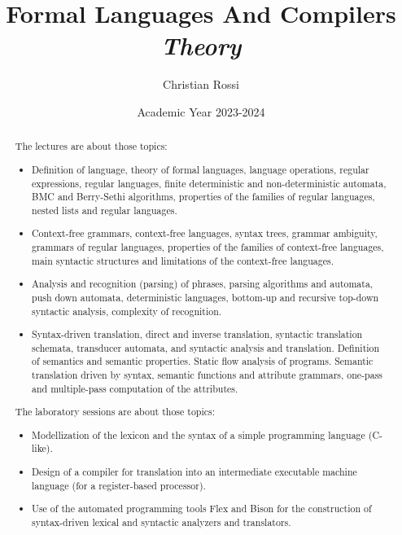 \documentclass[12pt, a4paper]{report}
\title{Formal Languages And Compilers \\ \textit{Theory}}
\author{Christian Rossi}
\date{Academic Year 2023-2024}
\newtheorem[style=M,bodystyle=\normalfont]{operation}{Operation}
\newtheorem[style=M,bodystyle=\normalfont]{theorem}{Theorem}
\newtheorem[style=M,bodystyle=\normalfont]{corollary}{Corollary}
\newtheorem[style=M,bodystyle=\normalfont]{lemma}{Lemma}
\newtheorem[style=M,bodystyle=\normalfont]{definition}{Definition}
\begin{document}
\maketitle

\newpage

\begin{abstract}
    The lectures are about those topics: 
    \begin{itemize}
        \item Definition of language, theory of formal languages, language operations, regular expressions, regular languages, finite deterministic and non-deterministic automata, 
            BMC and Berry-Sethi algorithms, properties of the families of regular languages, nested lists and regular languages.
        \item Context-free grammars, context-free languages, syntax trees, grammar ambiguity, grammars of regular languages, properties of the families of context-free languages, 
            main syntactic structures and limitations of the context-free languages.
        \item Analysis and recognition (parsing) of phrases, parsing algorithms and automata, push down automata, deterministic languages, bottom-up and recursive top-down syntactic 
            analysis, complexity of recognition.
        \item Syntax-driven translation, direct and inverse translation, syntactic translation schemata, transducer automata, and syntactic analysis and translation. Definition of 
            semantics and semantic properties. Static flow analysis of programs. Semantic translation driven by syntax, semantic functions and attribute grammars, one-pass and 
            multiple-pass computation of the attributes.
    \end{itemize}
    The laboratory sessions are about those topics: 
    \begin{itemize}
        \item Modellization of the lexicon and the syntax of a simple programming language (C-like).
        \item Design of a compiler for translation into an intermediate executable machine language (for a register-based processor).
        \item Use of the automated programming tools Flex and Bison for the construction of syntax-driven lexical and syntactic analyzers and translators.
    \end{itemize}
\end{abstract}
\end{document}
